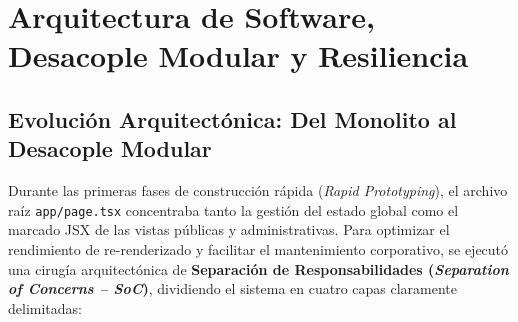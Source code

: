 \documentclass[12pt,a4paper,oneside]{report}
\begin{document}
\chapter{Arquitectura de Software, Desacople Modular y Resiliencia}

\section{Evolución Arquitectónica: Del Monolito al Desacople Modular}
Durante las primeras fases de construcción rápida (\textit{Rapid Prototyping}), el archivo raíz \texttt{app/page.tsx} concentraba tanto la gestión del estado global como el marcado JSX de las vistas públicas y administrativas. Para optimizar el rendimiento de re-renderizado y facilitar el mantenimiento corporativo, se ejecutó una cirugía arquitectónica de \textbf{Separación de Responsabilidades (\textit{Separation of Concerns -- SoC})}, dividiendo el sistema en cuatro capas claramente delimitadas:
\end{document}
